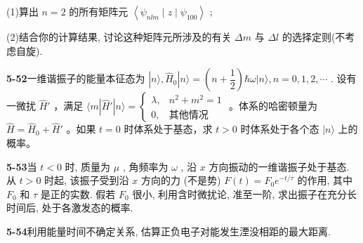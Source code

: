 (1)算出 $\displaystyle n = 2$ 的所有矩阵元 $\displaystyle \left\langle \psi_{nlm} \mid z \mid \psi_{100} \right\rangle$ ;

(2)结合你的计算结果, 讨论这种矩阵元所涉及的有关 $\displaystyle \Delta m$ 与 $\displaystyle \Delta l$ 的选择定则(不考虑自旋).

\vfill

\newpage

\textbf{5-52}\quad 一维谐振子的能量本征态为 $\displaystyle |n\rangle, \hat{H}_0 |n\rangle = \left(n + \dfrac{1}{2}\right)\hbar\omega |n\rangle, n = 0,1,2,\cdots$ . 设有一微扰 $\displaystyle \hat{H}'$ ，满足 $\displaystyle \langle m|\hat{H}'|n\rangle = \begin{cases} \lambda, & n^2 + m^2 = 1 \\ 0, & \text{其他情况} \end{cases}$ 。体系的哈密顿量为 $\displaystyle \hat{H} = \hat{H}_0 + \hat{H}'$ 。如果 $\displaystyle t = 0$ 时体系处于基态，求 $\displaystyle t > 0$ 时体系处于各个态 $\displaystyle |n\rangle$ 上的概率。

\vfill

\newpage

\textbf{5-53}\quad 当 $\displaystyle t < 0$ 时, 质量为 $\displaystyle \mu$ , 角频率为 $\displaystyle \omega$ , 沿 $\displaystyle x$ 方向振动的一维谐振子处于基态. 从 $\displaystyle t > 0$ 时起, 该振子受到沿 $\displaystyle x$ 方向的力 (不是势) $\displaystyle F(t) = F_0 e^{-t / \tau}$ 的作用, 其中 $\displaystyle F_0$ 和 $\displaystyle \tau$ 是正的实数. 假若 $\displaystyle F_0$ 很小, 利用含时微扰论, 准至一阶, 求出振子在充分长时间后, 处于各激发态的概率.

\vfill

\newpage

\textbf{5-54}\quad 利用能量时间不确定关系, 估算正负电子对能发生湮没相距的最大距离.

\vfill

\newpage

